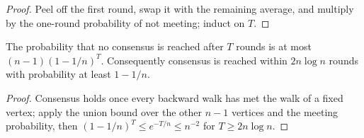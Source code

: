 \begin{proof}\leanok
Peel off the first round, swap it with the remaining average, and multiply by the
one-round probability of not meeting; induct on $T$.
\end{proof}
\begin{theorem}\label{thm:consensus-time}
\leanok{}
The probability that no consensus is reached after $T$ rounds is at most
$(n-1)(1-1/n)^T$. Consequently consensus is reached within $2n\log n$ rounds with
probability at least $1-1/n$.
\end{theorem}
\begin{proof}\leanok
Consensus holds once every backward walk has met the walk of a fixed vertex; apply the
union bound over the other $n-1$ vertices and the meeting probability, then
$(1-1/n)^T\le e^{-T/n}\le n^{-2}$ for $T\ge 2n\log n$.
\end{proof}

